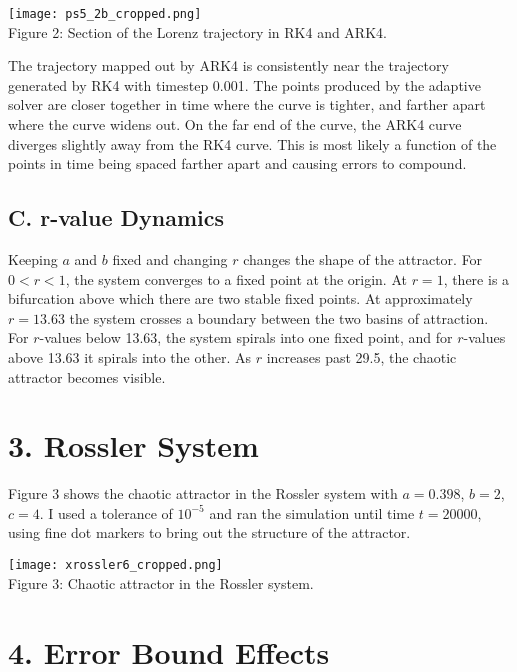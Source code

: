 \documentclass[12pt, letterpaper]{article}
\begin{document}
\begin{center}
\texttt{[image: ps5\_2b\_cropped.png]}
\\
Figure 2: Section of the Lorenz trajectory in RK4 and ARK4.
\end{center}

The trajectory mapped out by ARK4 is consistently near the trajectory generated
by RK4 with timestep 0.001. The points produced by the adaptive solver are closer 
together in time where the curve is tighter, and farther apart where the curve
widens out. On the far end of the curve, the ARK4 curve diverges slightly away 
from the RK4 curve. This is most likely a function of the points in time being
spaced farther apart and causing errors to compound.

\subsection*{C. r-value Dynamics}

Keeping $a$ and $b$ fixed and changing $r$ changes the shape of the attractor. 
For $0 < r < 1$, the system converges to a fixed point at the origin. At $r=1$,
there is a bifurcation above which there are two stable fixed points. At 
approximately $r = 13.63$ the system crosses a boundary between the two basins of 
attraction. For $r$-values below 13.63, the system spirals into one fixed point,
and for $r$-values above 13.63 it spirals into the other. As $r$ increases past
29.5, the chaotic attractor becomes visible. 

\section*{3. Rossler System}

Figure 3 shows the chaotic attractor in the Rossler system with $a=0.398$, $b=2$,
$c=4$. I used a tolerance of $10^{-5}$ and ran the simulation until time 
$t=20000$, using fine dot markers to bring out the structure of the attractor.

\begin{center}
\texttt{[image: xrossler6\_cropped.png]}
\\
Figure 3: Chaotic attractor in the Rossler system.
\end{center}

\section*{4. Error Bound Effects}
\end{document}
